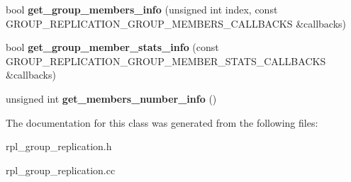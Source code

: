 \begin{DoxyCompactItemize}
\item 
\mbox{\label{classGroup__replication__handler_a2ebf27ba777e462437027bf161ff996d}} 
bool {\bfseries get\+\_\+group\+\_\+members\+\_\+info} (unsigned int index, const G\+R\+O\+U\+P\+\_\+\+R\+E\+P\+L\+I\+C\+A\+T\+I\+O\+N\+\_\+\+G\+R\+O\+U\+P\+\_\+\+M\+E\+M\+B\+E\+R\+S\+\_\+\+C\+A\+L\+L\+B\+A\+C\+KS \&callbacks)
\item 
\mbox{\label{classGroup__replication__handler_a0c0a1cddea8cbf1a63c1223da095559a}} 
bool {\bfseries get\+\_\+group\+\_\+member\+\_\+stats\+\_\+info} (const G\+R\+O\+U\+P\+\_\+\+R\+E\+P\+L\+I\+C\+A\+T\+I\+O\+N\+\_\+\+G\+R\+O\+U\+P\+\_\+\+M\+E\+M\+B\+E\+R\+\_\+\+S\+T\+A\+T\+S\+\_\+\+C\+A\+L\+L\+B\+A\+C\+KS \&callbacks)
\item 
\mbox{\label{classGroup__replication__handler_a51b8dd4b7fca1b6562cdbddb9f9425b1}} 
unsigned int {\bfseries get\+\_\+members\+\_\+number\+\_\+info} ()
\end{DoxyCompactItemize}


The documentation for this class was generated from the following files\+:\begin{DoxyCompactItemize}
\item 
rpl\+\_\+group\+\_\+replication.\+h\item 
rpl\+\_\+group\+\_\+replication.\+cc\end{DoxyCompactItemize}
